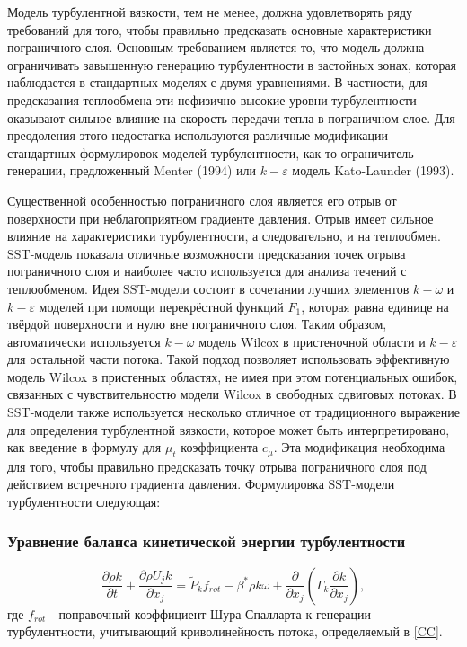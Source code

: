 \documentclass[pdftex,a4paper,12pt]{article}
\begin{document}
		Модель турбулентной вязкости, тем не менее, должна удовлетворять ряду требований для того, чтобы правильно предсказать основные характеристики пограничного слоя. Основным требованием является то, что модель должна ограничивать завышенную генерацию турбулентности в застойных зонах, которая наблюдается в стандартных моделях с двумя уравнениями. В частности, для предсказания теплообмена эти нефизично высокие уровни турбулентности оказывают сильное влияние на скорость передачи тепла в пограничном слое. Для преодоления этого недостатка используются различные модификации стандартных формулировок моделей турбулентности, как то ограничитель генерации, предложенный Menter (1994) или $k-\varepsilon$ модель Kato-Launder (1993).
		
		Существенной особенностью пограничного слоя является его отрыв от поверхности при неблагоприятном градиенте давления. Отрыв имеет сильное влияние на характеристики турбулентности, а следовательно, и на теплообмен. SST-модель показала отличные	 возможности предсказания точек отрыва пограничного слоя и наиболее часто используется для анализа течений с теплообменом. Идея SST-модели состоит в сочетании лучших элементов $k-\omega$ и $k-\varepsilon$ моделей при помощи перекрёстной функций $F_1$, которая равна единице на твёрдой поверхности и нулю вне пограничного слоя. Таким образом, автоматически используется $k-\omega$ модель Wilcox  в пристеночной области и $k-\varepsilon$ для остальной части потока. Такой подход позволяет использовать эффективную модель Wilcox в пристенных областях, не имея при этом потенциальных ошибок, связанных с чувствительностю модели Wilcox в свободных сдвиговых потоках. В SST-модели также используется несколько отличное от традиционного выражение для определения турбулентной вязкости, которое может быть интерпретировано, как введение в формулу для $\mu_t$ коэффициента $c_{\mu}$. Эта модификация необходима для того, чтобы правильно предсказать точку отрыва пограничного слоя под действием встречного градиента давления. \cite{Menter}
		Формулировка SST-модели турбулентности следующая:
		\newpage
		\subsubsection{Уравнение баланса кинетической энергии турбулентности}
				\begin{equation}
				\frac{\partial \rho k}{\partial t} + \frac{\partial \rho U_j k}{\partial x_j} = \tilde{P}_k f_{rot} - \beta^* \rho k \omega + \frac{\partial}{\partial x_j}(\Gamma_k \frac{\partial k}{\partial x_j}),
				\end{equation}
				где $f_{rot}$ - поправочный коэффициент Шура-Спалларта к генерации турбулентности, учитывающий криволинейность потока, определяемый в \ref{CC}.
\end{document}
